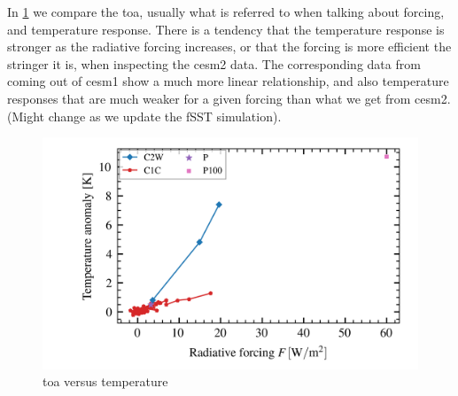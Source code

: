 \documentclass[twocol]{ametsocV5}
\begin{document}
In \cref{fig:toa_vs_temp} we compare the \acrshort{toa}, usually what is referred to
when talking about forcing, and temperature response. There is a tendency that the
temperature response is stronger as the radiative forcing increases, or that the forcing
is more efficient the stringer it is, when inspecting the \acrshort{cesm2} data. The
corresponding data from \citet{ottobliesner2016} coming out of \acrshort{cesm1} show a
much more linear relationship, and also temperature responses that are much weaker for a
given forcing than what we get from \acrshort{cesm2}. (Might change as we update the
fSST simulation).

\begin{figure}
  \begin{center}
    \includegraphics[width=0.95\linewidth]{figures/toa_vs_temperature.png}
  \end{center}
  \caption{\acrshort{toa} versus temperature}%
  \label{fig:toa_vs_temp}
\end{figure}

\clearpage


\end{document}
